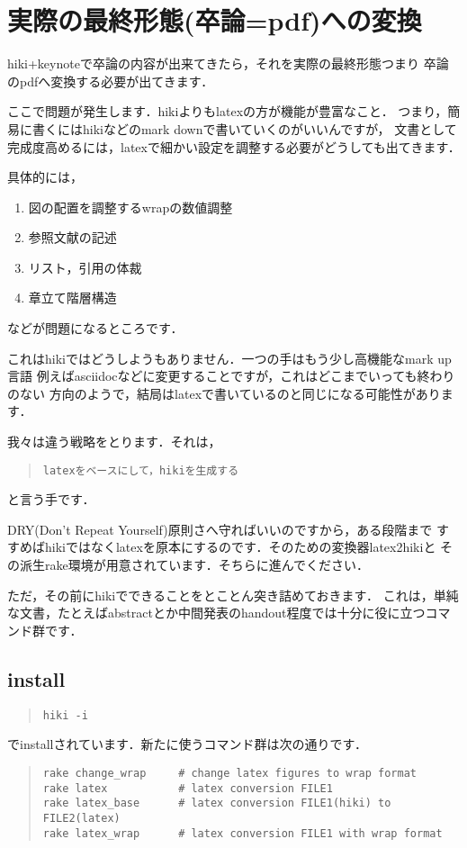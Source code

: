 \documentclass[12pt,a4paper]{jsarticle}
\begin{document}
\section{実際の最終形態(卒論=pdf)への変換}
hiki+keynoteで卒論の内容が出来てきたら，それを実際の最終形態つまり
卒論のpdfへ変換する必要が出てきます．

ここで問題が発生します．hikiよりもlatexの方が機能が豊富なこと．
つまり，簡易に書くにはhikiなどのmark downで書いていくのがいいんですが，
文書として完成度高めるには，latexで細かい設定を調整する必要がどうしても出てきます．

具体的には，
\begin{enumerate}
\item 図の配置を調整するwrapの数値調整
\item 参照文献の記述
\item リスト，引用の体裁
\item 章立て階層構造
\end{enumerate}
などが問題になるところです．

これはhikiではどうしようもありません．一つの手はもう少し高機能なmark up言語
例えばasciidocなどに変更することですが，これはどこまでいっても終わりのない
方向のようで，結局はlatexで書いているのと同じになる可能性があります．

我々は違う戦略をとります．それは，
\begin{quote}\begin{verbatim}
latexをベースにして，hikiを生成する
\end{verbatim}\end{quote}
と言う手です．

DRY(Don't Repeat Yourself)原則さへ守ればいいのですから，ある段階まで
すすめばhikiではなくlatexを原本にするのです．そのための変換器latex2hikiと
その派生rake環境が用意されています．そちらに進んでください．

ただ，その前にhikiでできることをとことん突き詰めておきます．
これは，単純な文書，たとえばabstractとか中間発表のhandout程度では十分に役に立つコマンド群です．

\subsection{install}\begin{quote}\begin{verbatim}
hiki -i
\end{verbatim}\end{quote}
でinstallされています．新たに使うコマンド群は次の通りです．
\begin{quote}\begin{verbatim}
rake change_wrap     # change latex figures to wrap format
rake latex           # latex conversion FILE1
rake latex_base      # latex conversion FILE1(hiki) to FILE2(latex)
rake latex_wrap      # latex conversion FILE1 with wrap format
\end{verbatim}\end{quote}
\end{document}

